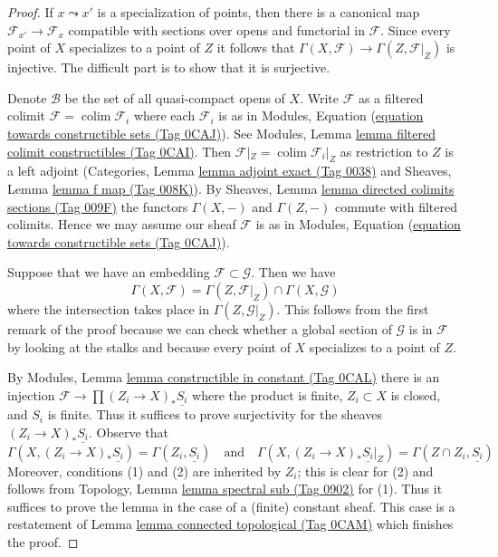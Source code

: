\documentclass{amsart}
\theoremstyle{plain}
\theoremstyle{definition}
\theoremstyle{remark}
\numberwithin{equation}{subsection}
\def\colim{\mathop{\mathrm{colim}}\nolimits}
\begin{document}
\begin{proof}
If $x \leadsto x'$ is a specialization of points, then there is a
canonical map $\mathcal{F}_{x'} \to \mathcal{F}_x$ compatible with
sections over opens and functorial in $\mathcal{F}$. Since every point
of $X$ specializes to a point of $Z$ it follows that
$\Gamma(X, \mathcal{F}) \to \Gamma(Z, \mathcal{F}|_Z)$ is injective.
The difficult part is to show that it is surjective.

\medskip\noindent
Denote $\mathcal{B}$ be the set of all quasi-compact opens of $X$.
Write $\mathcal{F}$ as a filtered colimit $\mathcal{F} = \colim \mathcal{F}_i$
where each $\mathcal{F}_i$ is as in
Modules, Equation (\href{https://stacks.math.columbia.edu/tag/0CAJ}{equation towards constructible sets (Tag 0CAJ)}).
See Modules, Lemma \href{https://stacks.math.columbia.edu/tag/0CAI}{lemma filtered colimit constructibles (Tag 0CAI)}.
Then $\mathcal{F}|_Z = \colim \mathcal{F}_i|_Z$ as restriction to $Z$
is a left adjoint (Categories, Lemma \href{https://stacks.math.columbia.edu/tag/0038}{lemma adjoint exact (Tag 0038)} and
Sheaves, Lemma \href{https://stacks.math.columbia.edu/tag/008K}{lemma f map (Tag 008K)}).
By Sheaves, Lemma \href{https://stacks.math.columbia.edu/tag/009F}{lemma directed colimits sections (Tag 009F)}
the functors $\Gamma(X, -)$ and $\Gamma(Z, -)$ commute with filtered colimits.
Hence we may assume our sheaf $\mathcal{F}$ is as in
Modules, Equation (\href{https://stacks.math.columbia.edu/tag/0CAJ}{equation towards constructible sets (Tag 0CAJ)}).

\medskip\noindent
Suppose that we have an embedding $\mathcal{F} \subset \mathcal{G}$.
Then we have
$$
\Gamma(X, \mathcal{F}) =
\Gamma(Z, \mathcal{F}|_Z) \cap \Gamma(X, \mathcal{G})
$$
where the intersection takes place in $\Gamma(Z, \mathcal{G}|_Z)$.
This follows from the first remark of the proof because we can check
whether a global section of $\mathcal{G}$ is in $\mathcal{F}$ by looking
at the stalks and because every point of $X$ specializes to a point of $Z$.

\medskip\noindent
By Modules, Lemma \href{https://stacks.math.columbia.edu/tag/0CAL}{lemma constructible in constant (Tag 0CAL)}
there is an injection $\mathcal{F} \to \prod (Z_i \to X)_*\underline{S_i}$
where the product is finite, $Z_i \subset X$ is closed, and $S_i$ is finite.
Thus it suffices to prove surjectivity for the sheaves
$(Z_i \to X)_*\underline{S_i}$. Observe that
$$
\Gamma(X, (Z_i \to X)_*\underline{S_i}) = \Gamma(Z_i, \underline{S_i})
\quad\text{and}\quad
\Gamma(X, (Z_i \to X)_*\underline{S_i}|_Z) =
\Gamma(Z \cap Z_i, \underline{S_i})
$$
Moreover, conditions (1) and (2) are inherited by $Z_i$; this is clear
for (2) and follows from
Topology, Lemma \href{https://stacks.math.columbia.edu/tag/0902}{lemma spectral sub (Tag 0902)} for (1). Thus it
suffices to prove the lemma in the case of a (finite) constant sheaf.
This case is a restatement of Lemma \href{https://stacks.math.columbia.edu/tag/0CAM}{lemma connected topological (Tag 0CAM)}
which finishes the proof.
\end{proof}
\end{document}
